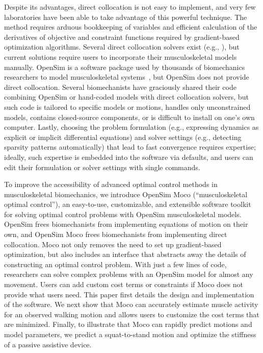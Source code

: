 \documentclass[10pt,letterpaper]{article}
\begin{document}
Despite its advantages, direct collocation is not easy to implement, and very few laboratories have been able to take advantage of this powerful technique. The method requires arduous bookkeeping of variables and efficient calculation of the derivatives of objective and constraint functions required by gradient-based optimization algorithms. Several direct collocation solvers exist (e.g., \cite{Becerra:2010,Patterson:2014}), but current solutions require users to incorporate their musculoskeletal models manually. OpenSim is a software package used by thousands of biomechanics researchers to model musculoskeletal systems~\cite{Delp:2007ij,Seth:2018gg,Sherman:2011byc}, but OpenSim does not provide direct collocation. Several biomechanists have graciously shared their code combining OpenSim or hand-coded models with direct collocation solvers, but such code is tailored to specific models or motions, handles only unconstrained models, contains closed-source components, or is difficult to install on one’s own computer. Lastly, choosing the problem formulation (e.g., expressing dynamics as explicit or implicit differential equations) and solver settings (e.g., detecting sparsity patterns automatically) that lead to fast convergence requires expertise; ideally, such expertise is embedded into the software via defaults, and users can edit their formulation or solver settings with single commands.

To improve the accessibility of advanced optimal control methods in musculoskeletal biomechanics, we introduce OpenSim Moco (“musculoskeletal optimal control”), an easy-to-use, customizable, and extensible software toolkit for solving optimal control problems with OpenSim musculoskeletal models. OpenSim frees biomechanists from implementing equations of motion on their own, and OpenSim Moco frees biomechanists from implementing direct collocation. Moco not only removes the need to set up gradient-based optimization, but also includes an interface that abstracts away the details of constructing an optimal control problem. With just a few lines of code, researchers can solve complex problems with an OpenSim model for almost any movement. Users can add custom cost terms or constraints if Moco does not provide what users need. This paper first details the design and implementation of the software. We next show that Moco can accurately estimate muscle activity for an observed walking motion and allows users to customize the cost terms that are minimized. Finally, to illustrate that Moco can rapidly predict motions and model parameters, we predict a squat-to-stand motion and optimize the stiffness of a passive assistive device.
\end{document}
